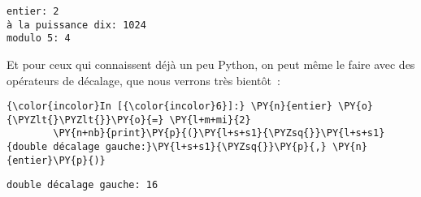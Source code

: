     \begin{Verbatim}[commandchars=\\\{\},frame=single,framerule=0.3mm,rulecolor=\color{cellframecolor}]
entier: 2
à la puissance dix: 1024
modulo 5: 4
\end{Verbatim}

    Et pour ceux qui connaissent déjà un peu Python, on peut même le faire
avec des opérateurs de décalage, que nous verrons très bientôt~:

    \begin{Verbatim}[commandchars=\\\{\},frame=single,framerule=0.3mm,rulecolor=\color{cellframecolor}]
{\color{incolor}In [{\color{incolor}6}]:} \PY{n}{entier} \PY{o}{\PYZlt{}\PYZlt{}}\PY{o}{=} \PY{l+m+mi}{2}
        \PY{n+nb}{print}\PY{p}{(}\PY{l+s+s1}{\PYZsq{}}\PY{l+s+s1}{double décalage gauche:}\PY{l+s+s1}{\PYZsq{}}\PY{p}{,} \PY{n}{entier}\PY{p}{)}
\end{Verbatim}


    \begin{Verbatim}[commandchars=\\\{\},frame=single,framerule=0.3mm,rulecolor=\color{cellframecolor}]
double décalage gauche: 16
\end{Verbatim}


    
    
    
